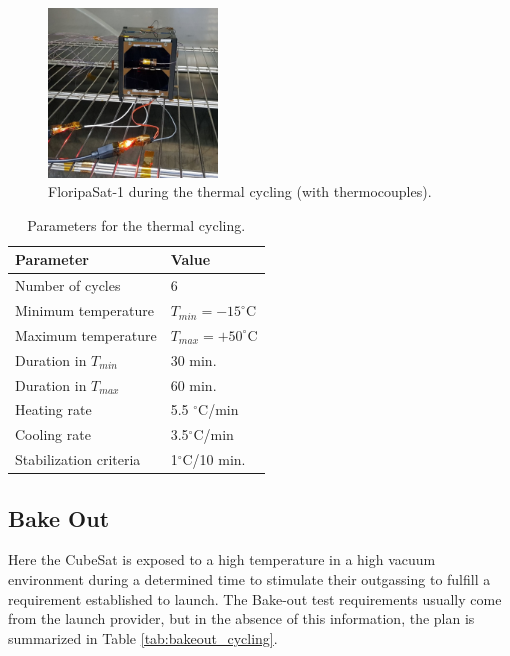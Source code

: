 \begin{figure}[!htb]
    \begin{center}
        \includegraphics[width=0.4\textwidth]{figures/fsat_fm_thermal_cycling.jpg}
        \caption{FloripaSat-1 during the thermal cycling (with thermocouples).}
        \label{fig:fsat-thermal-test}
    \end{center}
\end{figure}

\begin{table}[!htb]
\caption{Parameters for the thermal cycling.}
\centering
\begin{tabular}{|l|l|}\hline
		Parameter & Value  \\ \hline
	    Number of cycles    &  6 \\ \hline
	    Minimum temperature &  $T_{min}=-15 ^\circ$C \\ \hline
	    Maximum temperature & $T_{max}=+50 ^\circ$C \\ \hline
      Duration in $T_{min}$ & 30 min.               \\ \hline
	  Duration in $T_{max}$ & 60 min.               \\ \hline
	  Heating rate          & 5.5 $^\circ$C/min          \\ \hline
	   Cooling rate         & 3.5$^\circ$C/min      \\ \hline
	   Stabilization criteria & 1$^\circ$C/10 min.  \\ \hline
	    \end{tabular}
     \label{tab:thermal_cycling}
\end{table}


\subsection{Bake Out}

Here the CubeSat is exposed to a high temperature in a high vacuum environment during a determined time to stimulate their outgassing to fulfill a requirement established to launch. The Bake-out test requirements usually come from the launch provider, but in the absence of this information, the plan is summarized in Table \ref{tab:bakeout_cycling}. %


